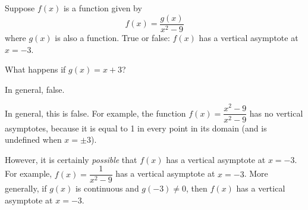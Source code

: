 %
%
\subsection*{\Conceptual}

\begin{Mquestion}
Suppose $f(x)$ is a function given by
\[f(x)= \frac{g(x)}{x^2-9}\]
where $g(x)$ is also a function. True or false: $f(x)$ has a vertical asymptote at $x=-3$.
\end{Mquestion}
\begin{hint}
What happens if $g(x)=x+3$?
\end{hint}
\begin{answer}
In general, false.
\end{answer}
\begin{solution}
In general, this is false. For example, the function $f(x) = \dfrac{x^2-9}{x^2-9}$ has no vertical asymptotes, because it is equal to 1 in every point in its domain (and is undefined when $x=\pm3$).

However, it is certainly \emph{possible} that $f(x)$ has a vertical asymptote at $x=-3$. For example, $f(x)=\dfrac{1}{x^2-9}$ has a vertical asymptote at $x=-3$.  More generally, if $g(x)$ is continuous and $g(-3)\ne 0$,
          then $f(x)$ has a vertical asymptote at $x=-3$.
\end{solution}
\subsection*{\Procedural}


